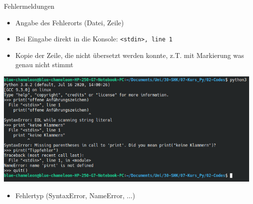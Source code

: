 \begin{frame}{Fehlermeldungen}
%
\begin{minipage}[t]{.29\linewidth}
\begin{itemize}
\item Angabe des Fehlerorts (Datei, Zeile)
\item Bei Eingabe direkt in die Konsole: \texttt{<stdin>, line 1}
\item Kopie der Zeile, die nicht übersetzt werden konnte, z.\;T. mit Markierung was genau nicht stimmt
\end{itemize}
\end{minipage}
%
%
\begin{minipage}[t]{.69\linewidth}
\vspace{0pt}
\includegraphics[width=\linewidth]{./gfx/errMsgs}
\end{minipage}
%
%
\begin{itemize}
\item Fehlertyp (SyntaxError, NameError, ...)
\end{itemize}
%
\end{frame}


